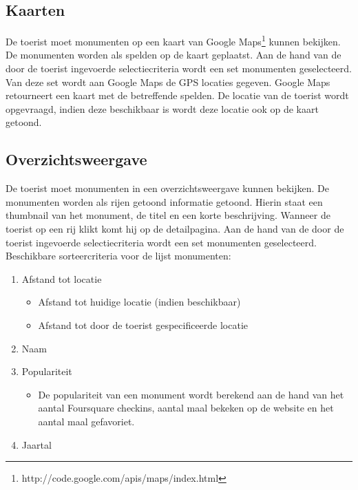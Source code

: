 \documentclass[a4paper,10pt]{article}
\begin{document}
            \subsection{Kaarten}
			De toerist moet monumenten op een kaart van Google Maps\footnote{http://code.google.com/apis/maps/index.html} kunnen bekijken. De monumenten worden als spelden op de kaart geplaatst. Aan de hand van de door de toerist ingevoerde selectiecriteria wordt een set monumenten geselecteerd. Van deze set wordt aan Google Maps de GPS locaties gegeven. Google Maps retourneert een kaart met de betreffende spelden. De locatie van de toerist wordt opgevraagd, indien deze beschikbaar is wordt deze locatie ook op de kaart getoond.

			\subsection{Overzichtsweergave}
			De toerist moet monumenten in een overzichtsweergave kunnen bekijken. De monumenten worden als rijen getoond informatie getoond. Hierin staat een thumbnail van het monument, de titel en een korte beschrijving. Wanneer de toerist op een rij klikt komt hij op de detailpagina.
			Aan de hand van de door de toerist ingevoerde selectiecriteria wordt een set monumenten geselecteerd.  Beschikbare sorteercriteria voor de lijst monumenten:
			\begin{enumerate}
			\item Afstand tot  locatie
			\begin{itemize}
			\item Afstand tot huidige locatie (indien beschikbaar)
			\item Afstand tot door de toerist gespecificeerde locatie
			\end{itemize}
			\item Naam
			\item Populariteit
			\begin{itemize}
			\item De populariteit van een monument wordt berekend aan de hand van het aantal Foursquare checkins, aantal maal bekeken op de website en het aantal maal gefavoriet. 
			\end{itemize}
			\item Jaartal
			\end{enumerate}
			
\end{document}
